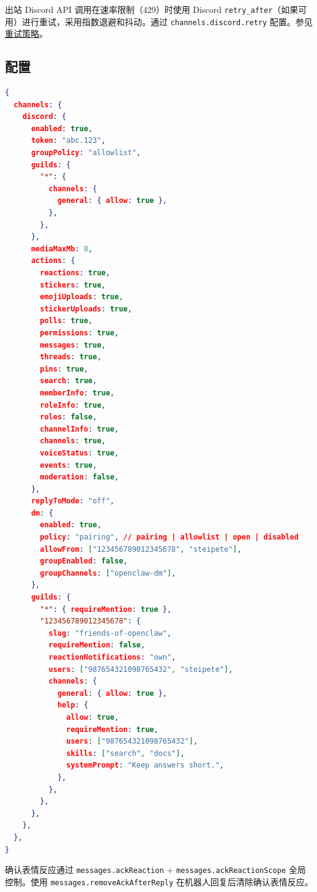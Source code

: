 出站 Discord API 调用在速率限制（429）时使用 Discord \texttt{retry\_after}（如果可用）进行重试，采用指数退避和抖动。通过 \texttt{channels.discord.retry} 配置。参见\href{/concepts/retry}{重试策略}。

\subsection{配置}


\begin{lstlisting}[language=json]
{
  channels: {
    discord: {
      enabled: true,
      token: "abc.123",
      groupPolicy: "allowlist",
      guilds: {
        "*": {
          channels: {
            general: { allow: true },
          },
        },
      },
      mediaMaxMb: 8,
      actions: {
        reactions: true,
        stickers: true,
        emojiUploads: true,
        stickerUploads: true,
        polls: true,
        permissions: true,
        messages: true,
        threads: true,
        pins: true,
        search: true,
        memberInfo: true,
        roleInfo: true,
        roles: false,
        channelInfo: true,
        channels: true,
        voiceStatus: true,
        events: true,
        moderation: false,
      },
      replyToMode: "off",
      dm: {
        enabled: true,
        policy: "pairing", // pairing | allowlist | open | disabled
        allowFrom: ["123456789012345678", "steipete"],
        groupEnabled: false,
        groupChannels: ["openclaw-dm"],
      },
      guilds: {
        "*": { requireMention: true },
        "123456789012345678": {
          slug: "friends-of-openclaw",
          requireMention: false,
          reactionNotifications: "own",
          users: ["987654321098765432", "steipete"],
          channels: {
            general: { allow: true },
            help: {
              allow: true,
              requireMention: true,
              users: ["987654321098765432"],
              skills: ["search", "docs"],
              systemPrompt: "Keep answers short.",
            },
          },
        },
      },
    },
  },
}
\end{lstlisting}


确认表情反应通过 \texttt{messages.ackReaction} + \texttt{messages.ackReactionScope} 全局控制。使用 \texttt{messages.removeAckAfterReply} 在机器人回复后清除确认表情反应。

